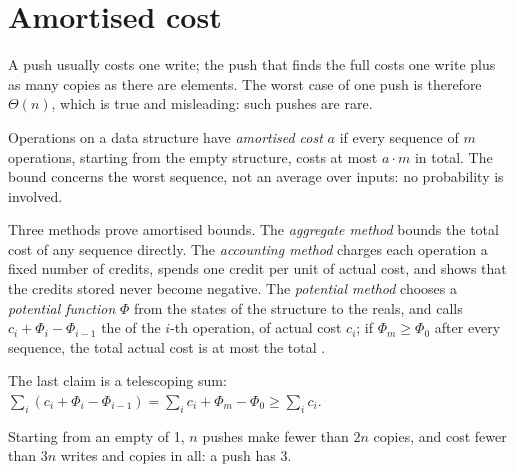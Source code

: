 \section{Amortised cost}\label{sec:b1:dynamic-arrays:amortised}

A push usually costs one write; the push that finds the  full costs one write plus as many copies as there are
elements. The worst case of one push is therefore $\Theta(n)$, which is true and misleading: such pushes are rare.

\begin{definition}\label{def:b1:dynamic-arrays:amortised}
Operations on a data structure have \emph{amortised cost} $a$ if every sequence of $m$
operations, starting from the empty structure, costs at most $a \cdot m$ in total. The bound concerns the worst sequence,
not an average over inputs: no probability is involved.
\end{definition}

\begin{definition}\label{def:b1:dynamic-arrays:methods}
Three methods prove amortised bounds. The \emph{aggregate method} bounds the total cost of any
sequence directly. The \emph{accounting method} charges each operation a fixed number of
credits, spends one credit per unit of actual cost, and shows that the credits stored never become negative. The
\emph{potential method} chooses a \emph{potential function} $\Phi$ from the states of the
structure to the reals, and calls $c_i + \Phi_i - \Phi_{i-1}$ the  of the $i$-th operation, of actual
cost $c_i$; if $\Phi_m \geq \Phi_0$ after every sequence, the total actual cost is at most the total .
\end{definition}

The last claim is a telescoping sum: $\sum_i (c_i + \Phi_i - \Phi_{i-1}) = \sum_i c_i + \Phi_m - \Phi_0 \geq \sum_i
c_i$.

\begin{proposition}\label{prop:b1:dynamic-arrays:pushes}
Starting from an empty  of  1, $n$ pushes make fewer than $2n$ copies, and cost fewer than $3n$ writes and
copies in all: a push has  3.
\end{proposition}

